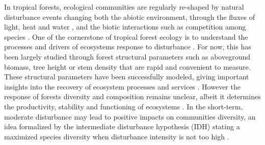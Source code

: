 \documentclass[fleqn,10pt]{ArtEcoFoG} %
\begin{document}
In tropical forests, ecological communities are regularly re-shaped by
natural disturbance events changing both the abiotic environment,
through the fluxes of light, heat and water \citep{Goulamoussene2017},
and the biotic interactions such as competition among species
\citep{Chesson2000}. One of the cornerstone of tropical forest ecology
is to understand the processes and drivers of ecosystems response to
disturbance \citep{Chazdon2003a}. For now, this has been largely studied
through forest structural parameters such as aboveground biomass, tree
height or stem density \citep{Piponiot2016, Rutishauser2016} that are
rapid and convenient to measure. These structural parameters have been
successfully modeled, giving important insights into the recovery of
ecosystem processes and services \citep{Herault2018}. However the
response of forests diversity and composition remains unclear, albeit it
determines the productivity, stability and functioning of ecosystems
\citep{Tilman2014, Liang2016}. In the short-term, moderate disturbance
may lead to positive impacts on communities diversity, an idea
formalized by the intermediate disturbance hypothesis (IDH) stating a
maximized species diversity when disturbance intensity is not too high
\citep{Molino2001, Kariuki2006a}.
\end{document}
